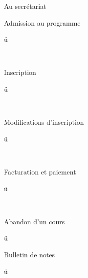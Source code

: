 \documentclass [12 pt]{article}
\begin{document}
                            
                                Au secrétariat
                            
                        
                        
                            Admission au programme
                            
                                
                                    ü
                                
                            
                             
                        
                        
                            Inscription
                            
                                
                                    ü
                                
                            
                             
                        
                        
                            Modifications d'inscription
                            
                                
                                    ü
                                
                            
                             
                        
                        
                            Facturation et paiement
                            
                                
                                    ü
                                
                            
                             
                        
                        
                            Abandon d'un cours
                             
                            
                                
                                    ü
                                
                            
                        
                        
                            Bulletin de notes
                            
                                
                                    ü
                                
                            
                             
                        
\end{document}
